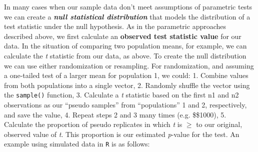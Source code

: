 \documentclass[]{book}
\begin{document}
In many cases when our sample data don't meet assumptions of parametric tests we can create a \textbf{\emph{null statistical distribution}} that models the distribution of a test statistic under the null hypothesis. As in the parametric approaches described above, we first calculate an \textbf{observed test statistic value} for our data. In the situation of comparing two population means, for example, we can calculate the \emph{t} statistic from our data, as above. To create the null distribution we can use either randomization or resampling. For randomization, and assuming a one-tailed test of a larger mean for population 1, we could:
1. Combine values from both populations into a single vector,
2. Randomly shuffle the vector using the \texttt{sample()} function,
3. Calculate a \emph{t} statistic based on the first n1 and n2 observations as our ``pseudo samples'' from ``populations'' 1 and 2, respectively, and save the value,
4. Repeat steps 2 and 3 many times (e.g. \$\geq\$1000),
5. Calculate the proportion of pseudo replicates in which \emph{t} is \(\geq\) to our original, observed value of \emph{t}. This proportion is our estimated \emph{p}-value for the test.
An example using simulated data in \texttt{R} is as follows:
\end{document}
